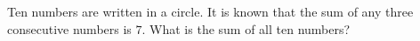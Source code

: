 Ten numbers are written in a circle. It is known that the sum of any three consecutive numbers is $7$. What is the sum of all ten numbers?
